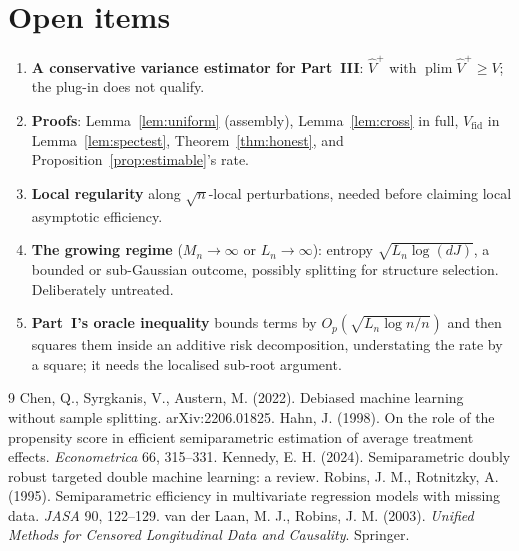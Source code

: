 \documentclass[11pt]{article}
\theoremstyle{plain}
\theoremstyle{definition}
\theoremstyle{remark}
\newcommand{\Vhat}{\widehat{V}}
\begin{document}
\section{Open items}\label{sec:open}

\begin{enumerate}[nosep,label=(\arabic*)]
  \item \textbf{A conservative variance estimator for Part~III}: $\Vhat^{+}$ with
  $\operatorname{plim}\Vhat^{+}\ge V$; the plug-in does not qualify.
  \item \textbf{Proofs}: Lemma~\ref{lem:uniform} (assembly),
  Lemma~\ref{lem:cross} in full, $V_{\mathrm{fid}}$ in
  Lemma~\ref{lem:spectest}, Theorem~\ref{thm:honest}, and
  Proposition~\ref{prop:estimable}'s rate.
  \item \textbf{Local regularity} along $\sqrt n$-local perturbations, needed
  before claiming local asymptotic efficiency.
  \item \textbf{The growing regime} ($M_n\to\infty$ or $L_n\to\infty$): entropy
  $\sqrt{L_n\log(dJ)}$, a bounded or sub-Gaussian outcome, possibly splitting for
  structure selection. Deliberately untreated.
  \item \textbf{Part~I's oracle inequality} bounds terms by
  $O_p(\sqrt{L_n\log n/n})$ and then squares them inside an additive risk
  decomposition, understating the rate by a square; it needs the localised
  sub-root argument.
\end{enumerate}

\begin{thebibliography}{9}
 Chen, Q., Syrgkanis, V., Austern, M.
  (2022). Debiased machine learning without sample splitting. arXiv:2206.01825.
 Hahn, J. (1998). On the role of the propensity
  score in efficient semiparametric estimation of average treatment effects.
  \emph{Econometrica} 66, 315--331.
 Kennedy, E. H. (2024). Semiparametric
  doubly robust targeted double machine learning: a review.
 Robins, J. M., Rotnitzky, A.
  (1995). Semiparametric efficiency in multivariate regression models with
  missing data. \emph{JASA} 90, 122--129.
 van der Laan, M. J.,
  Robins, J. M. (2003). \emph{Unified Methods for Censored Longitudinal Data and
  Causality}. Springer.
\end{thebibliography}
\end{document}
